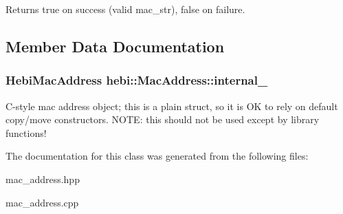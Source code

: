 \begin{DoxyReturn}{Returns}
\textquotesingle{}true\textquotesingle{} on success (valid mac\+\_\+str), \textquotesingle{}false\textquotesingle{} on failure. 
\end{DoxyReturn}


\subsection{Member Data Documentation}
\subsubsection[{\texorpdfstring{internal\+\_\+}{internal_}}]{\setlength{\rightskip}{0pt plus 5cm}Hebi\+Mac\+Address hebi\+::\+Mac\+Address\+::internal\+\_\+}\hypertarget{classhebi_1_1MacAddress_ad199d2d2ce7c50825f8d75ade88dd4e7}{}\label{classhebi_1_1MacAddress_ad199d2d2ce7c50825f8d75ade88dd4e7}
C-\/style mac address object; this is a plain struct, so it is OK to rely on default copy/move constructors. N\+O\+TE\+: this should not be used except by library functions! 

The documentation for this class was generated from the following files\+:\begin{DoxyCompactItemize}
\item 
mac\+\_\+address.\+hpp\item 
mac\+\_\+address.\+cpp\end{DoxyCompactItemize}
